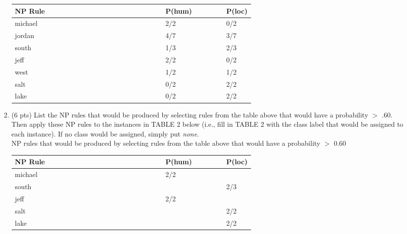 \documentclass[11pt]{article}
\begin{document}
\begin{enumerate}
\begin{enumerate}
   \begin{center} 
    \begin{tabular}{lll} 
   \textbf{NP Rule~~~~~~~~~~~~~~~~~~~~~~~~~~~~~} &
   \textbf{P({\sc hum)~~~~~~~}} & \textbf{P({\sc loc})} \\ \hline
  michael   ~ & 2/2 & 0/2 \\ \hline
  jordan  ~ & 4/7 & 3/7 \\ \hline
 south   ~ & 1/3 & 2/3 \\ \hline
jeff  ~ & 2/2 & 0/2 \\ \hline
  west  ~ & 1/2 & 1/2 \\ \hline
  salt   ~ &  0/2 & 2/2 \\ \hline
  lake   ~ & 0/2 &  2/2\\ \hline

   \end{tabular}
   \end{center}
 \vspace*{.2in}


\newpage
\item (6 pts) List the NP rules that would be produced by selecting
  rules from the table above that would have a probability $>$ .60. Then apply these NP rules to the
  instances in TABLE 2 below (i.e., fill in  TABLE 2 with the class
  label that would be assigned to each instance). If no class
  would be assigned, simply put {\it none}. \\

NP rules that would be produced by selecting rules from the table above that would have a probability $>$ 0.60 \\

   \begin{center} 
    \begin{tabular}{lll} 
   \textbf{NP Rule~~~~~~~~~~~~~~~~~~~~~~~~~~~~~} &
   \textbf{P({\sc hum)~~~~~~~}} & \textbf{P({\sc loc})} \\ \hline
  michael   ~ & 2/2 &  \\ \hline
 south   ~ &  & 2/3 \\ \hline
jeff  ~ & 2/2 &  \\ \hline
  salt   ~ &   & 2/2 \\ \hline
  lake   ~ &  &  2/2\\ \hline

   \end{tabular}
   \end{center}
 \vspace*{.2in}




\end{enumerate}
\end{enumerate}
\end{document}
